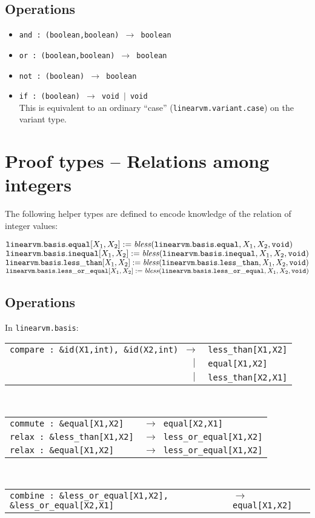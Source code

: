 \documentclass[a4paper]{book}
\newcommand\tyBless{{\ensuremath{\textnormal{\textit{bless}}}}}
\begin{document}
\subsection*{Operations}

\begin{itemize}
\item \texttt{and : (boolean,boolean) $\to$ boolean }
\item \texttt{or : (boolean,boolean) $\to$ boolean }
\item \texttt{not : (boolean) $\to$ boolean }
\item \texttt{if : (boolean) $\to$ void $|$ void }
  \\ This is equivalent to an ordinary ``case''
  (\texttt{linearvm.variant.case}) on the variant type.
\end{itemize}

\section{Proof types -- Relations among integers}

The following helper types are defined to encode knowledge of the relation of
integer values:

\medskip
\noindent
$\mathtt{linearvm.basis.equal}[X_1,X_2] := \tyBless(\mathtt{linearvm.basis.equal}, X_1,X_2, \mathtt{void})$
$\mathtt{linearvm.basis.inequal}[X_1,X_2] := \tyBless(\mathtt{linearvm.basis.inequal}, X_1,X_2, \mathtt{void})$
$\mathtt{linearvm.basis.less\_than}[X_1,X_2] := \tyBless(\mathtt{linearvm.basis.less\_than}, X_1,X_2, \mathtt{void})$
$\mathtt{linearvm.basis.less\_or\_equal}[X_1,X_2] := \tyBless(\mathtt{linearvm.basis.less\_or\_equal}, X_1,X_2, \mathtt{void})$

\subsection*{Operations}

In \texttt{linearvm.basis}:\\
\begin{tabular}{r@{}l}
\texttt{compare : \&id(X1,int), \&id(X2,int) $\to$}
& \texttt{less\_than[X1,X2]}\\
$|\;$ & \texttt{equal[X1,X2]}\\
$|\;$ & \texttt{less\_than[X2,X1]}\\
\end{tabular}
\\
\begin{tabular}{l@{}l}
\texttt{commute : \&equal[X1,X2]} & \texttt{$\to$ equal[X2,X1]}\\
\texttt{relax : \&less\_than[X1,X2]} & \texttt{$\to$ less\_or\_equal[X1,X2]}\\
\texttt{relax : \&equal[X1,X2]} & \texttt{$\to$ less\_or\_equal[X1,X2]}\\
\end{tabular}
\\
\begin{tabular}{l@{}l}
\texttt{combine : \&less\_or\_equal[X1,X2], \&less\_or\_equal[X2,X1]}
& \texttt{$\to$ equal[X1,X2]}\\
\end{tabular}
\end{document}
